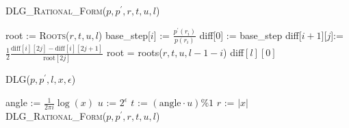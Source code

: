 \documentclass[sigconf]{acmart}
\begin{document}






\begin{algorithm}
\caption{\textsc{DLG\_Rational\_Form}($p,p^\prime,r,t,u,l$)}
\label{alg:DLG_rational_form}
\begin{algorithmic}
\STATE 	root      := \textsc{Roots}($r,t,u,l$)
\STATE 	base\_step[$i$] := $\frac{p^\prime(r_i)}{p(r_i)}$
\ENDFOR
\STATE  diff[0]   := base\_step
\STATE 			diff[$i+1$][$j$]:=$\frac{1}{2}\frac{\text{diff}[i][2j]-\text{diff}[i][2j+1]}{\text{root}[2j]}$
\STATE 		root = roots($r,t,u,l-1-i$)
\ENDFOR
\ENDFOR
\RETURN diff$[l][0]$
\end{algorithmic}
\end{algorithm}





\begin{algorithm}
\caption{\textsc{DLG}($p,p^\prime,l,x, \epsilon$)}
\label{alg:rational_angle_approx}
\begin{algorithmic}
\STATE angle     := $\frac{1}{2\pi i} \log (x)$
\STATE $u $    := $2^{\epsilon}$
\STATE$t$      :=  $(\text{angle} \cdot u)\% 1$
\STATE $r$      := $|x|$
\RETURN \textsc{DLG\_Rational\_Form}($p,p^\prime,r,t,u,l$)
\end{algorithmic}
\end{algorithm}

%




\end{document}
